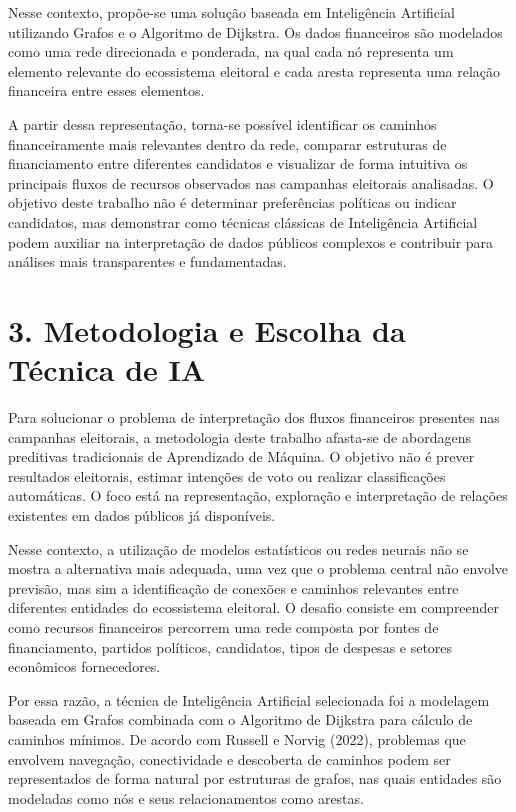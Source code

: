 \documentclass[11pt]{article}
\begin{document}
Nesse contexto, propõe-se uma solução baseada em Inteligência Artificial
utilizando Grafos e o Algoritmo de Dijkstra. Os dados financeiros são
modelados como uma rede direcionada e ponderada, na qual cada nó
representa um elemento relevante do ecossistema eleitoral e cada aresta
representa uma relação financeira entre esses elementos.

A partir dessa representação, torna-se possível identificar os caminhos
financeiramente mais relevantes dentro da rede, comparar estruturas de
financiamento entre diferentes candidatos e visualizar de forma
intuitiva os principais fluxos de recursos observados nas campanhas
eleitorais analisadas. O objetivo deste trabalho não é determinar
preferências políticas ou indicar candidatos, mas demonstrar como
técnicas clássicas de Inteligência Artificial podem auxiliar na
interpretação de dados públicos complexos e contribuir para análises
mais transparentes e fundamentadas.

    \section{3. Metodologia e Escolha da Técnica de
IA}\label{metodologia-e-escolha-da-tuxe9cnica-de-ia}

Para solucionar o problema de interpretação dos fluxos financeiros
presentes nas campanhas eleitorais, a metodologia deste trabalho
afasta-se de abordagens preditivas tradicionais de Aprendizado de
Máquina. O objetivo não é prever resultados eleitorais, estimar
intenções de voto ou realizar classificações automáticas. O foco está na
representação, exploração e interpretação de relações existentes em
dados públicos já disponíveis.

Nesse contexto, a utilização de modelos estatísticos ou redes neurais
não se mostra a alternativa mais adequada, uma vez que o problema
central não envolve previsão, mas sim a identificação de conexões e
caminhos relevantes entre diferentes entidades do ecossistema eleitoral.
O desafio consiste em compreender como recursos financeiros percorrem
uma rede composta por fontes de financiamento, partidos políticos,
candidatos, tipos de despesas e setores econômicos fornecedores.

Por essa razão, a técnica de Inteligência Artificial selecionada foi a
modelagem baseada em Grafos combinada com o Algoritmo de Dijkstra para
cálculo de caminhos mínimos. De acordo com Russell e Norvig (2022),
problemas que envolvem navegação, conectividade e descoberta de caminhos
podem ser representados de forma natural por estruturas de grafos, nas
quais entidades são modeladas como nós e seus relacionamentos como
arestas.
\end{document}
